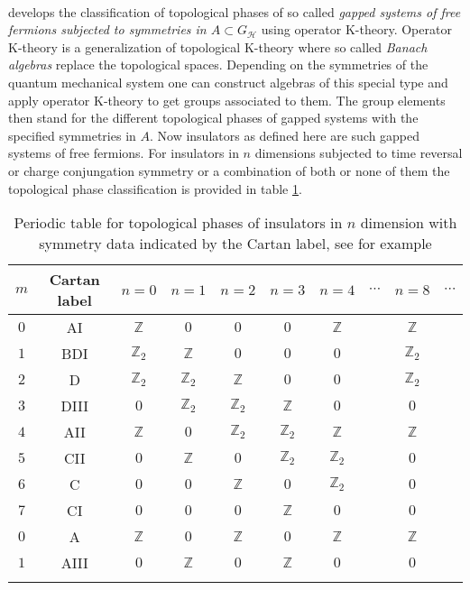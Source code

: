 \\
\cite{c9fb3de7} develops the classification of topological phases of so called \textit{gapped systems of free fermions subjected to symmetries in $A \subset G_{\mathcal{H}}$} using operator K-theory. Operator K-theory is a generalization of topological K-theory where so called \textit{Banach algebras} replace the topological spaces. Depending on the symmetries of the quantum mechanical system one can construct algebras of this special type and apply operator K-theory to get groups associated to them. The group elements then stand for the different topological phases of gapped systems with the specified symmetries in $A$. Now insulators as defined here are such gapped systems of free fermions. For insulators in $n$ dimensions subjected to time reversal or charge conjungation symmetry or a combination of both or none of them the topological phase classification is provided in table \ref{tab:pt}.
\begin{table}[h!]
\begin{tabular}{cccccccccc}
  \hline
  $m$
  &
  Cartan label
  &
  $n=0$
  &
  $n=1$
  &
  $n=2$
  &
  $n=3$
  &
  $n=4$
  &
  $\cdots$
  &
  $n=8$
  &
  $\cdots$
  \\
  \hline
  $0$
  &
  AI
  &
  $\mathbb{Z}$
  &
  $0$
  &
  $0$
  &
  $0$
  &
  $\mathbb{Z}$
  &
  &
  $\mathbb{Z}$
  &
  \\
  $1$
  &
  BDI
  &
  $\mathbb{Z}_{2}$
  &
  $\mathbb{Z}$
  &
  $0$
  &
  $0$
  &
  $0$
  &
  &
  $\mathbb{Z}_{2}$
  &
  \\
  $2$
  &
  D
  &
  $\mathbb{Z}_{2}$
  &
  $\mathbb{Z}_{2}$
  &
  $\mathbb{Z}$
  &
  $0$
  &
  $0$
  &
  &
  $\mathbb{Z}_{2}$
  &
  \\
  $3$
  &
  DIII
  &
  $0$
  &
  $\mathbb{Z}_{2}$
  &
  $\mathbb{Z}_{2}$
  &
  $\mathbb{Z}$
  &
  $0$
  &
  &
  $0$
  &
  \\
  $4$
  &
  AII
  &
  $\mathbb{Z}$
  &
  $0$
  &
  $\mathbb{Z}_{2}$
  &
  $\mathbb{Z}_{2}$
  &
  $\mathbb{Z}$
  &
  &
  $\mathbb{Z}$
  &
  \\
  $5$
  &
  CII
  &
  $0$
  &
  $\mathbb{Z}$
  &
  $0$
  &
  $\mathbb{Z}_{2}$
  &
  $\mathbb{Z}_{2}$
  &
  &
  $0$
  &
  \\
  $6$
  &
  C
  &
  $0$
  &
  $0$
  &
  $\mathbb{Z}$
  &
  $0$
  &
  $\mathbb{Z}_{2}$
  &
  &
  $0$
  &
  \\
  $7$
  &
  CI
  &
  $0$
  &
  $0$
  &
  $0$
  &
  $\mathbb{Z}$
  &
  $0$
  &
  &
  $0$
  &
  \\
  \hline
  \hline
  $0$
  &
  A
  &
  $\mathbb{Z}$
  &
  $0$
  &
  $\mathbb{Z}$
  &
  $0$
  &
  $\mathbb{Z}$
  &
  &
  $\mathbb{Z}$
  &
  \\
  $1$
  &
  AIII
  &
  $0$
  &
  $\mathbb{Z}$
  &
  $0$
  &
  $\mathbb{Z}$
  &
  $0$
  &
  &
  $0$
  \\
  \hline
  \\
\end{tabular}
\caption{Periodic table for topological phases of insulators in $n$ dimension with symmetry data indicated by the Cartan label, see \cite{9104a30f} for example}
\label{tab:pt}
\end{table}
